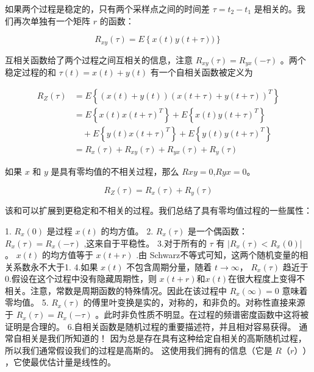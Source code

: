 	     如果两个过程是稳定的，只有两个采样点之间的时间差 $ \tau=t_{2}-t_{1} $ 是相关的。我们再次单独有一个矩阵 $ r $ 的函数：
	     
	     \begin{equation}\label{5.12}
	     R_{xy}(\tau) = E\left\lbrace x(t)y(t+\tau)) \right\rbrace 
	     \end{equation}
	      
	     互相关函数给了两个过程之间互相关的信息，注意  $ R_{xy}(\tau)=R_{yx}(-\tau) $ 。两个稳定过程的和 $ \tau(t)=x(t)+y(t) $ 有一个自相关函数被定义为
	     
	      \begin{equation}\label{5.13}
	     \begin{aligned}
	     R_{Z}(\tau)&=E\left\lbrace (x(t)+y(t))(x(t+\tau)+y(t+\tau))^{T}\right\rbrace\\
	     &=E\left\lbrace x(t)x(t+\tau)^{T}\right\rbrace +E\left\lbrace x(t)y(t+\tau)^{T}\right\rbrace\\
	     &\quad +E\left\lbrace y(t)x(t+\tau)^{T}\right\rbrace+E\left\lbrace y(t)y(t+\tau)^{T}\right\rbrace \\
	     &=R_{x}(\tau)+R_{xy}(\tau)+R_{yx}(\tau) +R_{y}(\tau)
	     \end{aligned}  
	     \end{equation}
	     
	     如果 $ x $ 和 $ y $ 是具有零均值的不相关过程，那么 $ Rxy =0  $,$ Ryx=0 $。
	     
	      \begin{equation}\label{5.14}
	     R_{Z}(\tau)=R_{x}(\tau)+R_{y}(\tau) 
	     \end{equation}
	      
	      该和可以扩展到更稳定和不相关的过程。我们总结了具有零均值过程的一些属性：
	      
	      1. $ R_{x}(0) $ 是过程 $  x(t) $ 的均方值。 
	      2.  $ R_{x}(\tau) $ 是一个偶函数：$  R_{x}(\tau)= R_{x}(-\tau) $ ,这来自于平稳性。
	      3.对于所有的 $ \tau $ 有 $ \left|R_{x}(\tau) < R_{x}(0) \right|  $ 。 $x(t)$ 的均方值等于  $x(t+r)$ .由 Schwarz不等式可知，这两个随机变量的相关系数永不大于1.
	      4.如果 $ x(t) $ 不包含周期分量，随着 $t\rightarrow\infty$， $R_{x}(\tau)$  趋近于0.假设在这个过程中没有隐藏周期性，则 $ x(t + r)  $和$  x(t) $在很大程度上变得不相关。注意，常数是周期函数的特殊情况。因此在该过程中 $R_{x}(\infty)=0$  意味着零均值。
	      5. $ R_{x}(\tau)$ 的傅里叶变换是实的，对称的，和非负的。对称性直接来源于 $R_{x}(\tau)=R_{x}(-\tau) $ 。此时非负性质不明显。在过程的频谱密度函数中这将被证明是合理的。
	      6.自相关函数是随机过程的重要描述符，并且相对容易获得。 通常自相关是我们所知道的！ 因为总是存在具有这种给定自相关的高斯随机过程，所以我们通常假设我们的过程是高斯的。 这使用我们拥有的信息（它是 $ R（r）） $，它使最优估计量是线性的。
	      
